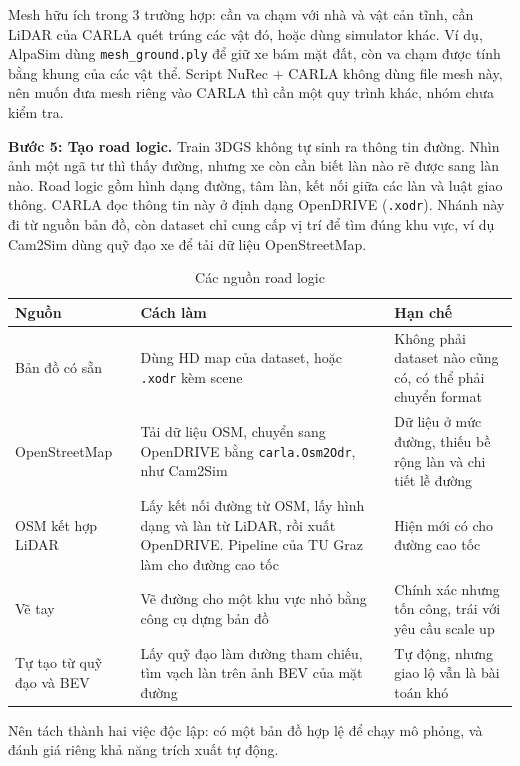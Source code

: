 Mesh hữu ích trong 3 trường hợp: cần va chạm với nhà và vật cản tĩnh, cần LiDAR của CARLA quét trúng các vật đó, hoặc dùng simulator khác.
Ví dụ, AlpaSim dùng \texttt{mesh\_ground.ply} để giữ xe bám mặt đất, còn va chạm được tính bằng khung của các vật thể.
Script NuRec + CARLA không dùng file mesh này, nên muốn đưa mesh riêng vào CARLA thì cần một quy trình khác, nhóm chưa kiểm tra.

\textbf{Bước 5: Tạo road logic.}
Train 3DGS không tự sinh ra thông tin đường. Nhìn ảnh một ngã tư thì thấy đường, nhưng xe còn cần biết làn nào rẽ được sang làn nào.
Road logic gồm hình dạng đường, tâm làn, kết nối giữa các làn và luật giao thông. CARLA đọc thông tin này ở định dạng OpenDRIVE (\texttt{.xodr}).
Nhánh này đi từ nguồn bản đồ, còn dataset chỉ cung cấp vị trí để tìm đúng khu vực, ví dụ Cam2Sim dùng quỹ đạo xe để tải dữ liệu OpenStreetMap.

\begin{table}[H]
  \centering
  \small
  \caption{Các nguồn road logic}
  \begin{tabularx}{\linewidth}{>{\raggedright\arraybackslash}p{3cm} >{\raggedright\arraybackslash}X >{\raggedright\arraybackslash}X}
    \toprule
    \textbf{Nguồn} & \textbf{Cách làm} & \textbf{Hạn chế} \\
    \midrule
    Bản đồ có sẵn & Dùng HD map của dataset, hoặc \texttt{.xodr} kèm scene & Không phải dataset nào cũng có, có thể phải chuyển format \\
    \addlinespace
    OpenStreetMap & Tải dữ liệu OSM, chuyển sang OpenDRIVE bằng \texttt{carla.\allowbreak Osm2Odr}, như Cam2Sim & Dữ liệu ở mức đường, thiếu bề rộng làn và chi tiết lề đường \\
    \addlinespace
    OSM kết hợp LiDAR & Lấy kết nối đường từ OSM, lấy hình dạng và làn từ LiDAR, rồi xuất OpenDRIVE. Pipeline của TU Graz làm cho đường cao tốc & Hiện mới có cho đường cao tốc \\
    \addlinespace
    Vẽ tay & Vẽ đường cho một khu vực nhỏ bằng công cụ dựng bản đồ & Chính xác nhưng tốn công, trái với yêu cầu scale up \\
    \addlinespace
    Tự tạo từ quỹ đạo và BEV & Lấy quỹ đạo làm đường tham chiếu, tìm vạch làn trên ảnh BEV của mặt đường & Tự động, nhưng giao lộ vẫn là bài toán khó \\
    \bottomrule
  \end{tabularx}
\end{table}

Nên tách thành hai việc độc lập: có một bản đồ hợp lệ để chạy mô phỏng, và đánh giá riêng khả năng trích xuất tự động.

